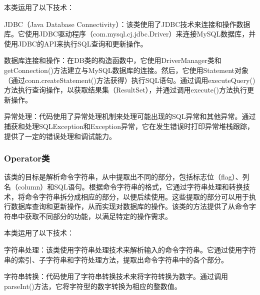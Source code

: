 本类运用了以下技术：

JDBC（Java Database Connectivity）：该类使用了JDBC技术来连接和操作数据库。它使用JDBC驱动程序（com.mysql.cj.jdbc.Driver）来连接MySQL数据库，并使用JDBC的API来执行SQL查询和更新操作。

数据库连接和操作：在DB类的构造函数中，它使用DriverManager类和getConnection()方法建立与MySQL数据库的连接。然后，它使用Statement对象（通过conn.createStatement()方法获得）执行SQL语句。通过调用executeQuery()方法执行查询操作，以获取结果集（ResultSet），并通过调用execute()方法执行更新操作。

异常处理：代码使用了异常处理机制来处理可能出现的SQL异常和其他异常。通过捕获和处理SQLException和Exception异常，它在发生错误时打印异常堆栈跟踪，提供了一定的错误处理和调试能力。

\subsubsection{Operator类}
该类的目标是解析命令字符串，从中提取出不同的部分，包括标志位（flag）、列名（column）和SQL语句。根据命令字符串的格式，它通过字符串处理和转换技术，将命令字符串拆分成相应的部分，以便后续使用。这些提取的部分可以用于执行数据库查询和更新操作，从而实现对数据库的操作。该类的方法提供了从命令字符串中获取不同部分的功能，以满足特定的操作需求。

本类运用了以下技术：

字符串处理：该类使用字符串处理技术来解析输入的命令字符串。它通过使用字符串的索引、子字符串和字符处理方法，提取出命令字符串中的各个部分。

字符串转换：代码使用了字符串转换技术来将字符转换为数字。通过调用parseInt()方法，它将字符型的数字转换为相应的整数值。
\newpage
